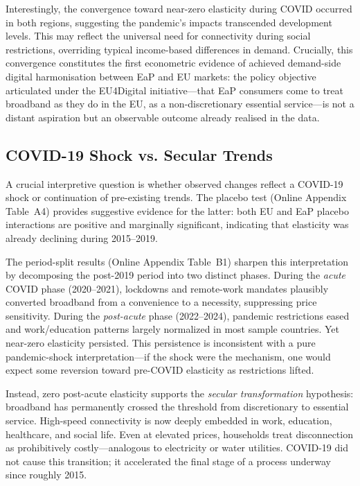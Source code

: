 Interestingly, the convergence toward near-zero elasticity during COVID occurred in both regions, suggesting the pandemic's impacts transcended development levels. This may reflect the universal need for connectivity during social restrictions, overriding typical income-based differences in demand. Crucially, this convergence constitutes the first econometric evidence of achieved demand-side digital harmonisation between EaP and EU markets: the policy objective articulated under the EU4Digital initiative---that EaP consumers come to treat broadband as they do in the EU, as a non-discretionary essential service---is not a distant aspiration but an observable outcome already realised in the data.

\subsection{COVID-19 Shock vs. Secular Trends}

A crucial interpretive question is whether observed changes reflect a COVID-19 shock or
continuation of pre-existing trends. The placebo test (Online Appendix Table~A4) provides
suggestive evidence for the latter: both EU and EaP
placebo interactions are positive and marginally significant, indicating that elasticity
was already declining during 2015--2019.

The period-split results (Online Appendix Table~B1) sharpen this interpretation by
decomposing the post-2019 period into two distinct phases. During the \emph{acute} COVID
phase (2020--2021), lockdowns and remote-work mandates plausibly converted broadband from
a convenience to a necessity, suppressing price sensitivity. During the \emph{post-acute}
phase (2022--2024), pandemic restrictions eased and work/education patterns largely normalized
in most sample countries. Yet near-zero elasticity persisted. This persistence is
inconsistent with a pure pandemic-shock interpretation---if the shock were the mechanism,
one would expect some reversion toward pre-COVID elasticity as restrictions lifted.

Instead, zero post-acute elasticity supports the \emph{secular transformation} hypothesis:
broadband has permanently crossed the threshold from discretionary to essential service.
High-speed connectivity is now deeply embedded
in work, education, healthcare, and social life. Even at elevated prices, households treat
disconnection as prohibitively costly---analogous to electricity or water utilities. COVID-19
did not cause this transition; it accelerated the final stage of a process underway since
roughly 2015.

